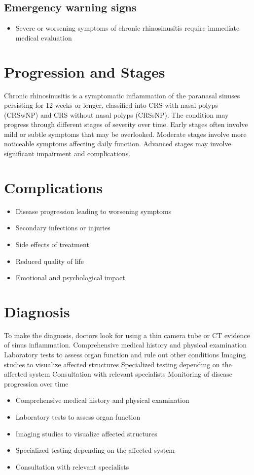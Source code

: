\subsection{Emergency warning signs}
\begin{itemize}[noitemsep]
  \item Severe or worsening symptoms of chronic rhinosinusitis require immediate medical evaluation
\end{itemize}
\section{Progression and Stages}
Chronic rhinosinusitis is a symptomatic inflammation of the paranasal sinuses persisting for 12 weeks or longer, classified into CRS with nasal polyps (CRSwNP) and CRS without nasal polyps (CRSsNP). The condition may progress through different stages of severity over time. Early stages often involve mild or subtle symptoms that may be overlooked. Moderate stages involve more noticeable symptoms affecting daily function. Advanced stages may involve significant impairment and complications.
\section{Complications}
\begin{itemize}[noitemsep]
  \item Disease progression leading to worsening symptoms
  \item Secondary infections or injuries
  \item Side effects of treatment
  \item Reduced quality of life
  \item Emotional and psychological impact
\end{itemize}
\section{Diagnosis}
To make the diagnosis, doctors look for using a thin camera tube or CT evidence of sinus inflammation. Comprehensive medical history and physical examination Laboratory tests to assess organ function and rule out other conditions Imaging studies to visualize affected structures Specialized testing depending on the affected system Consultation with relevant specialists Monitoring of disease progression over time

\begin{itemize}[noitemsep]
  \item Comprehensive medical history and physical examination
  \item Laboratory tests to assess organ function
  \item Imaging studies to visualize affected structures
  \item Specialized testing depending on the affected system
  \item Consultation with relevant specialists
\end{itemize}
